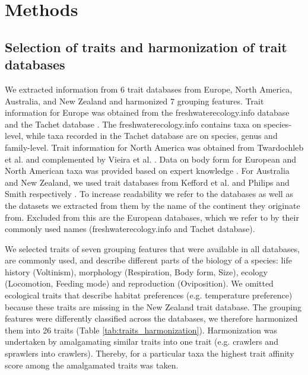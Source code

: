 \documentclass{article}
\begin{document}
\newpage

\section*{Methods}

\subsection*{Selection of traits and harmonization of trait databases}

We extracted information from 6 trait databases from Europe, North America, Australia, and New Zealand and harmonized 7 grouping features. Trait information for Europe was obtained from the freshwaterecology.info database \cite{schmidt-kloiber_www.freshwaterecology.info_2015} and the Tachet database \cite{usseglio-polatera_biomonitoring_2000}. The freshwaterecology.info contains taxa on species-level, while taxa recorded in the Tachet database are on species, genus and family-level. Trait information for North America was obtained from Twardochleb et al. \cite{twardochleb_trait_data_2020} and complemented by Vieira et al. \cite{vieira_database_nodate}. Data on body form for European and North American taxa was provided based on expert knowledge \cite{polatera_personal_information_2020}. For Australia and New Zealand, we used trait databases from Kefford et al. \cite{kefford_integrated_2020} and Philips and Smith respectively \cite{Philips_and_Smith_NZ_DB_2018}. To increase readability we refer to the databases as well as the datasets we extracted from them by the name of the continent they originate from. Excluded from this are the European databases, which we refer to by their commonly used names (freshwaterecology.info and Tachet database). 
 
We selected traits of seven grouping features that were available in all databases, are commonly used, and describe different parts of the biology of a species: life history (Voltinism), morphology (Respiration, Body form, Size), ecology (Locomotion, Feeding mode) and reproduction (Oviposition). We omitted ecological traits that describe habitat preferences (e.g. temperature preference) because these traits are missing in the New Zealand trait database. The grouping features were differently classified across the databases, we therefore harmonized them into 26 traits (Table \ref{tab:traits_harmonization}). Harmonization was undertaken by amalgamating similar traits into one trait (e.g. crawlers and sprawlers into crawlers). Thereby, for a particular taxa the highest trait affinity score among the amalgamated traits was taken. 
\end{document}

